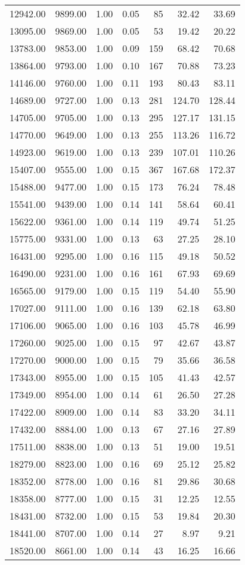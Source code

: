 \begin{table}
\begin{tabular}{rrrrrrr}
12942.00 & 9899.00 & 1.00 & 0.05 & 85 & 32.42 & 33.69 \\
13095.00 & 9869.00 & 1.00 & 0.05 & 53 & 19.42 & 20.22 \\
13783.00 & 9853.00 & 1.00 & 0.09 & 159 & 68.42 & 70.68 \\
13864.00 & 9793.00 & 1.00 & 0.10 & 167 & 70.88 & 73.23 \\
14146.00 & 9760.00 & 1.00 & 0.11 & 193 & 80.43 & 83.11 \\
14689.00 & 9727.00 & 1.00 & 0.13 & 281 & 124.70 & 128.44 \\
14705.00 & 9705.00 & 1.00 & 0.13 & 295 & 127.17 & 131.15 \\
14770.00 & 9649.00 & 1.00 & 0.13 & 255 & 113.26 & 116.72 \\
14923.00 & 9619.00 & 1.00 & 0.13 & 239 & 107.01 & 110.26 \\
15407.00 & 9555.00 & 1.00 & 0.15 & 367 & 167.68 & 172.37 \\
15488.00 & 9477.00 & 1.00 & 0.15 & 173 & 76.24 & 78.48 \\
15541.00 & 9439.00 & 1.00 & 0.14 & 141 & 58.64 & 60.41 \\
15622.00 & 9361.00 & 1.00 & 0.14 & 119 & 49.74 & 51.25 \\
15775.00 & 9331.00 & 1.00 & 0.13 & 63 & 27.25 & 28.10 \\
16431.00 & 9295.00 & 1.00 & 0.16 & 115 & 49.18 & 50.52 \\
16490.00 & 9231.00 & 1.00 & 0.16 & 161 & 67.93 & 69.69 \\
16565.00 & 9179.00 & 1.00 & 0.15 & 119 & 54.40 & 55.90 \\
17027.00 & 9111.00 & 1.00 & 0.16 & 139 & 62.18 & 63.80 \\
17106.00 & 9065.00 & 1.00 & 0.16 & 103 & 45.78 & 46.99 \\
17260.00 & 9025.00 & 1.00 & 0.15 & 97 & 42.67 & 43.87 \\
17270.00 & 9000.00 & 1.00 & 0.15 & 79 & 35.66 & 36.58 \\
17343.00 & 8955.00 & 1.00 & 0.15 & 105 & 41.43 & 42.57 \\
17349.00 & 8954.00 & 1.00 & 0.14 & 61 & 26.50 & 27.28 \\
17422.00 & 8909.00 & 1.00 & 0.14 & 83 & 33.20 & 34.11 \\
17432.00 & 8884.00 & 1.00 & 0.13 & 67 & 27.16 & 27.89 \\
17511.00 & 8838.00 & 1.00 & 0.13 & 51 & 19.00 & 19.51 \\
18279.00 & 8823.00 & 1.00 & 0.16 & 69 & 25.12 & 25.82 \\
18352.00 & 8778.00 & 1.00 & 0.16 & 81 & 29.86 & 30.68 \\
18358.00 & 8777.00 & 1.00 & 0.15 & 31 & 12.25 & 12.55 \\
18431.00 & 8732.00 & 1.00 & 0.15 & 53 & 19.84 & 20.30 \\
18441.00 & 8707.00 & 1.00 & 0.14 & 27 & 8.97 & 9.21 \\
18520.00 & 8661.00 & 1.00 & 0.14 & 43 & 16.25 & 16.66 \\
\bottomrule
\end{tabular}
\end{table}
